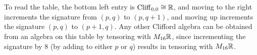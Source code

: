 $ $\\\\\\
To read the table, the bottom left entry is $\operatorname{Cliff}_{0,0} \cong \mathbb{R}$, and moving to
the right increments the signature from $(p,q)$ to $(p,q+1)$, and moving up
increments the signature $(p,q)$ to $(p+1,q)$. Any other Clifford algebra
can be obtained from an algebra on this table by tensoring with $M_{16}\mathbb{R}$, since
incrementing the signature by $8$ (by adding to either $p$ or $q$) results in
tensoring with $M_{16}\mathbb{R}$.
%
